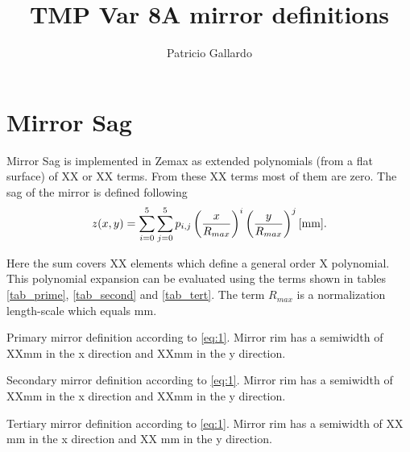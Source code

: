 \documentclass[12pt, letterpaper, twoside]{article}
\title{TMP Var 8A mirror definitions}
\author{Patricio Gallardo}
\begin{document}
\maketitle


\section{Mirror Sag}

Mirror Sag is implemented in Zemax as extended polynomials (from a flat surface) of XX or XX terms. From these XX terms most of them are zero. The sag of the mirror is defined following 
\begin{equation}
\label{eq:1}
z(x,y) = \sum_{i=0}^5 \sum_{j=0}^{5} p_{i,j} \left( \frac{x}{R_{max}}\right )^i \left(\frac{y}{R_{max}}\right)^j [\rm{mm}]. 
\end{equation}

Here the sum covers XX elements which define a general order X polynomial. This polynomial expansion can be evaluated using the terms shown in tables \ref{tab_prime}, \ref{tab_second} and \ref{tab_tert}. The term $R_{max}$ is a normalization length-scale which equals mm.

\begin{table}
	
	\caption{Primary mirror definition according to \ref{eq:1}. Mirror rim has a semiwidth of XXmm in the x direction and XXmm in the y direction.}
		\label{tab_prime}
\end{table}

\begin{table}

	
	\caption{Secondary mirror definition according to \ref{eq:1}. Mirror rim has a semiwidth of XXmm in the x direction and XXmm in the y direction.}
	\label{tab_second}
\end{table}

\begin{table}
	
	\caption{Tertiary mirror definition according to \ref{eq:1}. Mirror rim has a semiwidth of XX mm in the x direction and XX mm in the y direction.}
	\label{tab_tert}
\end{table}
\end{document}
